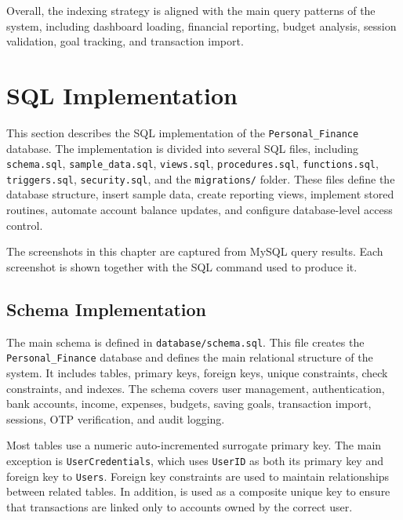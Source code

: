 \documentclass{article}
\begin{document}
Overall, the indexing strategy is aligned with the main query patterns of the system, including 
dashboard loading, financial reporting, budget analysis, session validation, goal tracking, and 
transaction import.

\section{SQL Implementation}
\label{sec:sql-implementation}

This section describes the SQL implementation of the \texttt{Personal\_Finance} database. 
The implementation is divided into several SQL files, including \texttt{schema.sql}, 
\texttt{sample\_data.sql}, \texttt{views.sql}, \texttt{procedures.sql}, 
\texttt{functions.sql}, \texttt{triggers.sql}, \texttt{security.sql}, and the 
\texttt{migrations/} folder. These files define the database structure, insert sample data, 
create reporting views, implement stored routines, automate account balance updates, and 
configure database-level access control.

The screenshots in this chapter are captured from MySQL query results. Each screenshot is 
shown together with the SQL command used to produce it.

\subsection{Schema Implementation}

The main schema is defined in \texttt{database/schema.sql}. This file creates the 
\texttt{Personal\_Finance} database and defines the main relational structure of the system. 
It includes tables, primary keys, foreign keys, unique constraints, check constraints, and 
indexes. The schema covers user management, authentication, bank accounts, income, expenses, 
budgets, saving goals, transaction import, sessions, OTP verification, and audit logging.

Most tables use a numeric auto-incremented surrogate primary key. The main exception is 
\texttt{UserCredentials}, which uses \texttt{UserID} as both its primary key and foreign key 
to \texttt{Users}. Foreign key constraints are used to maintain relationships between related 
tables. In addition,  is used as a composite unique key 
to ensure that transactions are linked only to accounts owned by the correct user.
\end{document}
